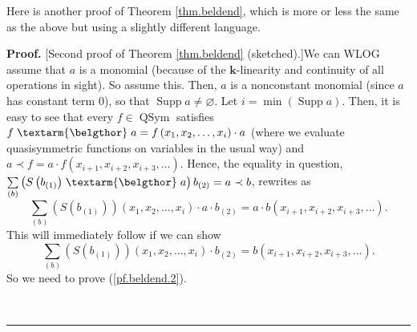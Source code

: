 \documentclass[numbers=enddot,12pt,final,onecolumn,notitlepage,abstracton]{scrartcl}%
\theoremstyle{definition}
\newenvironment{proof}[1][Proof]{\noindent\textbf{#1.} }{\ \rule{0.5em}{0.5em}}
\newenvironment{noncompile}{}{}
\newcommand{\bel}{\left. \textarm{\belgthor} \right.}
\let\sumnonlimits\sum
\renewcommand{\sum}{\sumnonlimits\limits}
\begin{document}
\begin{noncompile}
Here is another proof of Theorem \ref{thm.beldend}, which is more or less the
same as the above but using a slightly different language.

\begin{proof}
[Second proof of Theorem \ref{thm.beldend} (sketched).]We can WLOG assume that
$a$ is a monomial (because of the $\mathbf{k}$-linearity and continuity of all
operations in sight). So assume this. Then, $a$ is a nonconstant monomial
(since $a$ has constant term $0$), so that $\operatorname*{Supp}%
a\neq\varnothing$. Let $i=\min\left(  \operatorname*{Supp}a\right)  $. Then,
it is easy to see that every $f\in\operatorname*{QSym}$ satisfies $f\bel
a=f\left(  x_{1},x_{2},\ldots,x_{i}\right)  \cdot a$ (where we evaluate
quasisymmetric functions on variables in the usual way) and $a\left.
\prec\right.  f=a\cdot f\left(  x_{i+1},x_{i+2},x_{i+3},\ldots\right)  $.
Hence, the equality in question, $\sum_{\left(  b\right)  }\left(  S\left(
b_{\left(  1\right)  }\right)  \bel a\right)  b_{\left(  2\right)  }=a\left.
\prec\right.  b$, rewrites as%
\[
\sum_{\left(  b\right)  }\left(  S\left(  b_{\left(  1\right)  }\right)
\right)  \left(  x_{1},x_{2},\ldots,x_{i}\right)  \cdot a\cdot b_{\left(
2\right)  }=a\cdot b\left(  x_{i+1},x_{i+2},x_{i+3},\ldots\right)  .
\]
This will immediately follow if we can show%
\begin{equation}
\sum_{\left(  b\right)  }\left(  S\left(  b_{\left(  1\right)  }\right)
\right)  \left(  x_{1},x_{2},\ldots,x_{i}\right)  \cdot b_{\left(  2\right)
}=b\left(  x_{i+1},x_{i+2},x_{i+3},\ldots\right)  . \label{pf.beldend.2}%
\end{equation}
So we need to prove (\ref{pf.beldend.2}).


\end{proof}
\end{noncompile}
\end{document}
